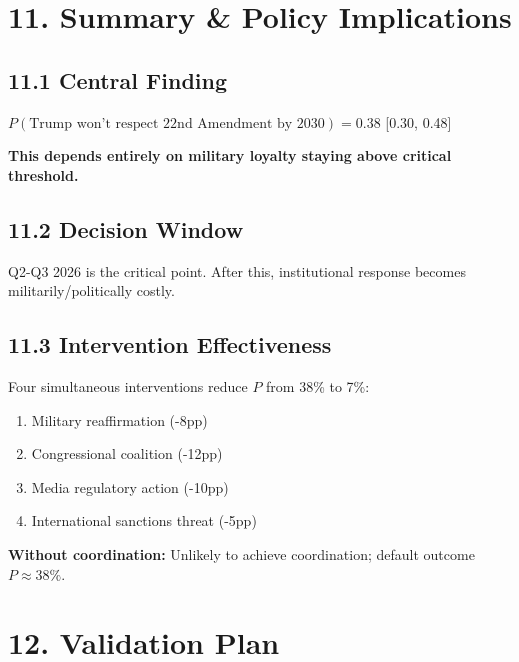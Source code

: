 \section{11. Summary \& Policy Implications}

\subsection{11.1 Central Finding}

\begin{fancybox}
\large
$P(\text{Trump won't respect 22nd Amendment by 2030}) = 0.38$ [0.30, 0.48]

\textbf{This depends entirely on military loyalty staying above critical threshold.}
\end{fancybox}

\subsection{11.2 Decision Window}

Q2-Q3 2026 is the critical point. After this, institutional response becomes militarily/politically costly.

\subsection{11.3 Intervention Effectiveness}

Four simultaneous interventions reduce $P$ from 38\% to 7\%:
\begin{enumerate}
\item Military reaffirmation (-8pp)
\item Congressional coalition (-12pp)
\item Media regulatory action (-10pp)
\item International sanctions threat (-5pp)
\end{enumerate}

\textbf{Without coordination:} Unlikely to achieve coordination; default outcome $P \approx 38\%$.

\section{12. Validation Plan}

